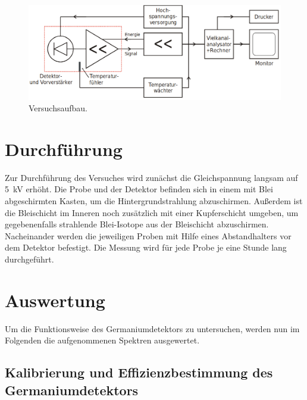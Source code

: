 \begin{figure}
  \centering
  \includegraphics[scale=0.4]{Aufbau.png}
  \caption{Versuchsaufbau. \cite{Q1}}
  \label{abb:2}
\end{figure}



\section{Durchführung}
Zur Durchführung des Versuches wird zunächst die Gleichspannung langsam auf \SI{5}{\kilo\volt}
erhöht.
Die Probe und der Detektor befinden sich in einem mit Blei abgeschirmten Kasten,
um die Hintergrundstrahlung abzuschirmen. Außerdem ist die Bleischicht im Inneren
noch zusätzlich mit einer Kupferschicht umgeben, um gegebenenfalls strahlende
Blei-Isotope aus der Bleischicht abzuschirmen.
Nacheinander werden die jeweiligen Proben mit Hilfe eines Abstandhalters
vor dem Detektor befestigt. Die Messung wird für jede Probe je eine Stunde lang
durchgeführt.

\section{Auswertung}
Um die Funktionsweise des Germaniumdetektors zu untersuchen, werden nun im Folgenden die aufgenommenen Spektren ausgewertet.

\subsection{Kalibrierung und Effizienzbestimmung des Germaniumdetektors}

